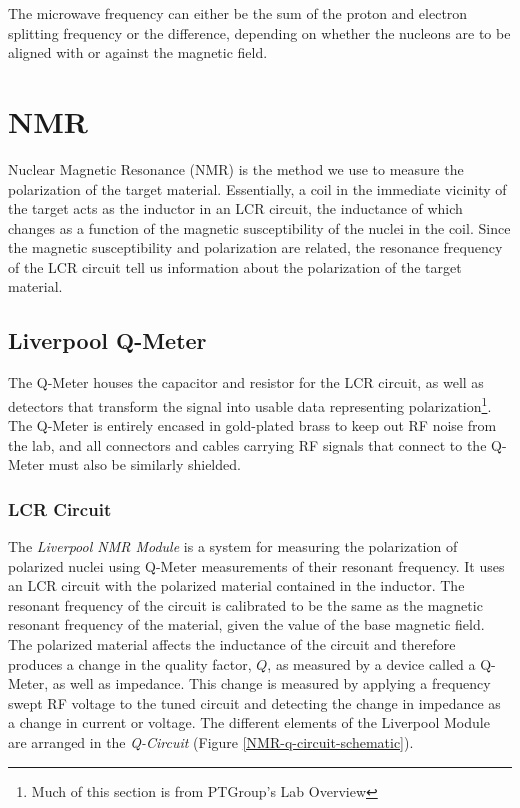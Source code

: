 The microwave frequency can either be the sum of the proton and electron splitting frequency or the difference, depending on whether the nucleons are to be aligned with or against the magnetic field. 
\section{NMR}

Nuclear Magnetic Resonance (NMR) is the method we use to measure the polarization of the target material.  Essentially, a coil in the immediate vicinity of the target acts as the inductor in an LCR circuit, the inductance of which changes as a function of the magnetic susceptibility of the nuclei in the coil.  Since the magnetic susceptibility and polarization are related, the resonance frequency of the LCR circuit tell us information about the polarization of the target material\cite{qmeterbook}. 

\subsection{Liverpool Q-Meter}

The Q-Meter houses the capacitor and resistor for the LCR circuit, as well as detectors that transform the signal into usable data representing polarization\footnote{Much of this section is from PTGroup's Lab Overview\cite{laboverview}}.  The Q-Meter is entirely encased in gold-plated brass to keep out RF noise from the lab, and all connectors and cables carrying RF signals that connect to the Q-Meter must also be similarly shielded.

\subsubsection{LCR Circuit}
\label{lcr}
The \textit{Liverpool NMR Module} is a system for measuring the polarization of polarized nuclei using Q-Meter measurements of their resonant frequency.  It uses an LCR circuit with the polarized material contained in the inductor. The resonant frequency of the circuit is calibrated to be the same as the magnetic resonant frequency of the material, given the value of the base magnetic field. The polarized material affects the inductance of the circuit and therefore produces a change in the quality factor, $Q$, as measured by a device called a Q-Meter, as well as impedance. This change is measured by applying a frequency swept RF voltage to the tuned circuit and detecting the change in impedance as a change in current or voltage. The different elements of the Liverpool Module are arranged in the \textit{Q-Circuit} (Figure \ref{NMR-q-circuit-schematic}).\\

